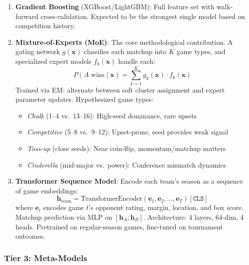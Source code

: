 \documentclass[11pt,a4paper]{article}
\begin{document}
\begin{enumerate}[nosep, start=4]
    \item \textbf{Gradient Boosting} (XGBoost/LightGBM): Full feature set with walk-forward cross-validation. Expected to be the strongest single model based on competition history.

    \item \textbf{Mixture-of-Experts (MoE)}: The core methodological contribution. A gating network $g(\mathbf{x})$ classifies each matchup into $K$ game types, and specialized expert models $f_k(\mathbf{x})$ handle each:
    \begin{equation}
        P(A \text{ wins} \mid \mathbf{x}) = \sum_{k=1}^{K} g_k(\mathbf{x}) \cdot f_k(\mathbf{x})
        \label{eq:moe}
    \end{equation}
    Trained via EM: alternate between soft cluster assignment and expert parameter updates. Hypothesized game types:
    \begin{itemize}[nosep]
        \item \emph{Chalk} (1--4 vs.\ 13--16): High-seed dominance, rare upsets
        \item \emph{Competitive} (5--8 vs.\ 9--12): Upset-prone, seed provides weak signal
        \item \emph{Toss-up} (close seeds): Near coin-flip, momentum/matchup matters
        \item \emph{Cinderella} (mid-major vs.\ power): Conference mismatch dynamics
    \end{itemize}

    \item \textbf{Transformer Sequence Model}: Encode each team's season as a sequence of game embeddings:
    \begin{equation}
        \mathbf{h}_{\text{team}} = \text{TransformerEncoder}(\mathbf{e}_1, \mathbf{e}_2, \ldots, \mathbf{e}_T)[\texttt{CLS}]
    \end{equation}
    where $\mathbf{e}_t$ encodes game $t$'s opponent rating, margin, location, and box score. Matchup prediction via MLP on $[\mathbf{h}_A ; \mathbf{h}_B]$. Architecture: 4 layers, 64-dim, 4 heads. Pretrained on regular-season games, fine-tuned on tournament outcomes.
\end{enumerate}

\subsubsection{Tier 3: Meta-Models}
\end{document}
